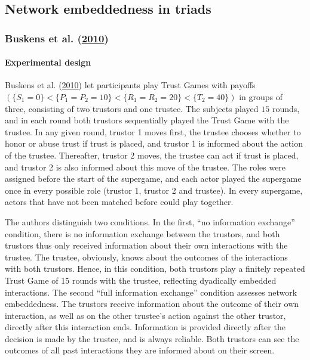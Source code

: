 \documentclass[
  11pt,
]{article}
\begin{document}
\hypertarget{network-embeddedness-in-triads}{%
\subsection{Network embeddedness in triads}\label{network-embeddedness-in-triads}}

\hypertarget{buskens_raub_veer_triads_2010}{%
\subsubsection{\texorpdfstring{Buskens et al. (\protect\hyperlink{ref-buskens_raub_veer_triads_2010}{2010})}{Buskens et al. (2010)}}\label{buskens_raub_veer_triads_2010}}

\hypertarget{experimental-design-4}{%
\paragraph{Experimental design}\label{experimental-design-4}}

Buskens et al. (\protect\hyperlink{ref-buskens_raub_veer_triads_2010}{2010}) let participants play Trust Games with payoffs \((\{S_1 = 0\} < \{P_1 = P_2 = 10\} < \{R_1 = R_2 = 20\} < \{T_2 = 40\})\) in groups of three, consisting of two trustors and one trustee. The subjects played \(15\) rounds, and in each round both trustors sequentially played the Trust Game with the trustee. In any given round, trustor 1 moves first, the trustee chooses whether to honor or abuse trust if trust is placed, and trustor 1 is informed about the action of the trustee. Thereafter, trustor 2 moves, the trustee can act if trust is placed, and trustor 2 is also informed about this move of the trustee. The roles were assigned before the start of the supergame, and each actor played the supergame once in every possible role (trustor 1, trustor 2 and trustee). In every supergame, actors that have not been matched before could play together.

The authors distinguish two conditions. In the first, ``no information exchange'' condition, there is no information exchange between the trustors, and both trustors thus only received information about their own interactions with the trustee. The trustee, obviously, knows about the outcomes of the interactions with both trustors. Hence, in this condition, both trustors play a finitely repeated Trust Game of 15 rounds with the trustee, reflecting dyadically embedded interactions.
The second ``full information exchange'' condition assesses network embeddedness.
The trustors receive information about the outcome of their own interaction, as well as on the other trustee's action against the other trustor, directly after this interaction ends.
Information is provided directly after the decision is made by the trustee, and is always reliable. Both trustors can see the outcomes of all past interactions they are informed about on their screen.
\end{document}
